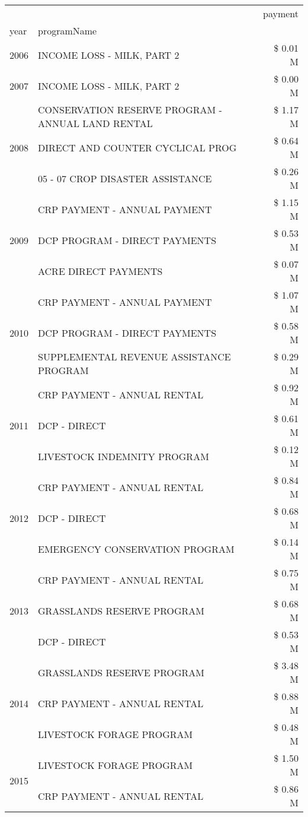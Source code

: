 \begin{tabular}{llr}
\toprule
 &  & payment \\
year & programName &  \\
\midrule
2006 & INCOME LOSS - MILK, PART 2 & \$ 0.01 M \\
\cline{1-3}
2007 & INCOME LOSS - MILK, PART 2 & \$ 0.00 M \\
\cline{1-3}
\multirow[t]{3}{*}{2008} & CONSERVATION RESERVE PROGRAM - ANNUAL LAND RENTAL & \$ 1.17 M \\
 & DIRECT AND COUNTER CYCLICAL PROG & \$ 0.64 M \\
 & 05 - 07 CROP DISASTER ASSISTANCE & \$ 0.26 M \\
\cline{1-3}
\multirow[t]{3}{*}{2009} & CRP PAYMENT - ANNUAL PAYMENT & \$ 1.15 M \\
 & DCP PROGRAM - DIRECT PAYMENTS & \$ 0.53 M \\
 & ACRE DIRECT PAYMENTS & \$ 0.07 M \\
\cline{1-3}
\multirow[t]{3}{*}{2010} & CRP PAYMENT - ANNUAL PAYMENT & \$ 1.07 M \\
 & DCP PROGRAM - DIRECT PAYMENTS & \$ 0.58 M \\
 & SUPPLEMENTAL REVENUE ASSISTANCE PROGRAM & \$ 0.29 M \\
\cline{1-3}
\multirow[t]{3}{*}{2011} & CRP PAYMENT - ANNUAL RENTAL & \$ 0.92 M \\
 & DCP - DIRECT & \$ 0.61 M \\
 & LIVESTOCK INDEMNITY PROGRAM & \$ 0.12 M \\
\cline{1-3}
\multirow[t]{3}{*}{2012} & CRP PAYMENT - ANNUAL RENTAL & \$ 0.84 M \\
 & DCP - DIRECT & \$ 0.68 M \\
 & EMERGENCY CONSERVATION PROGRAM & \$ 0.14 M \\
\cline{1-3}
\multirow[t]{3}{*}{2013} & CRP PAYMENT - ANNUAL RENTAL & \$ 0.75 M \\
 & GRASSLANDS RESERVE PROGRAM & \$ 0.68 M \\
 & DCP - DIRECT & \$ 0.53 M \\
\cline{1-3}
\multirow[t]{3}{*}{2014} & GRASSLANDS RESERVE PROGRAM & \$ 3.48 M \\
 & CRP PAYMENT - ANNUAL RENTAL & \$ 0.88 M \\
 & LIVESTOCK FORAGE PROGRAM & \$ 0.48 M \\
\cline{1-3}
\multirow[t]{3}{*}{2015} & LIVESTOCK FORAGE PROGRAM & \$ 1.50 M \\
 & CRP PAYMENT - ANNUAL RENTAL & \$ 0.86 M \\

\end{tabular}
